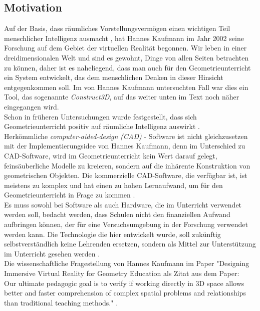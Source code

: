 \documentclass[deutsch]{llncs}
\begin{document}
\subsection{Motivation}
Auf der Basis, dass räumliches Vorstellungsvermögen einen wichtigen Teil menschlicher Intelligenz ausmacht \cite{spatial}, hat Hannes Kaufmann im Jahr 2002 seine Forschung auf dem Gebiet der virtuellen Realität begonnen.
Wir leben in einer dreidimensionalen Welt und sind es gewohnt, Dinge von allen Seiten betrachten zu können, daher ist es naheliegend, dass man auch für den Geometrieunterricht ein System entwickelt,
das dem menschlichen Denken in dieser Hinsicht entgegenkommen soll. Im von Hannes Kaufmann untersuchten Fall war dies ein Tool, das sogenannte \emph{Construct3D}, auf das weiter unten im Text noch näher eingegangen wird. \\
Schon in früheren Untersuchungen wurde festgestellt, dass sich Geometrieunterricht positiv auf räumliche Intelligenz auswirkt \cite{GittlerDifferentialTO}. \\
Herkömmliche  \emph{computer-aided-design (CAD)} - Software ist nicht gleichzusetzen mit der Implementierungsidee von Hannes Kaufmann, denn im Unterschied zu CAD-Software, wird im Geometrieunterricht kein Wert darauf gelegt, feinsäuberliche Modelle zu kreieren, sondern auf die inhärente Konstruktion von geometrischen Objekten. Die kommerzielle CAD-Software, die verfügbar ist, ist meistens zu komplex und hat einen zu hohen Lernaufwand, um für den Geometrieunterricht in Frage zu kommen  \cite{Kaufmann:2002:MGE:1242073.1242086}. \\
Es muss sowohl bei Software als auch Hardware, die im Unterricht verwendet werden soll, bedacht werden, dass Schulen nicht den finanziellen Aufwand aufbringen können, der für eine Versuchsumgebung in der Forschung verwendet werden kann.  Die Technologie die hier entwickelt wurde, soll zukünftig selbstverständlich keine Lehrenden ersetzen, sondern als Mittel zur Unterstützung im Unterricht gesehen werden \cite{article}. \\
Die wissenschaftliche Fragestellung von Hannes Kaufmann im Paper "Designing Immersive Virtual Reality for Geometry Education als Zitat aus dem Paper: \\
Our ultimate pedagogic goal is to verify if working directly in 3D space allows better and faster comprehension of complex spatial problems and relationships than traditional teaching methods." \cite{1667626}. \\
\noindent \\
\end{document}
